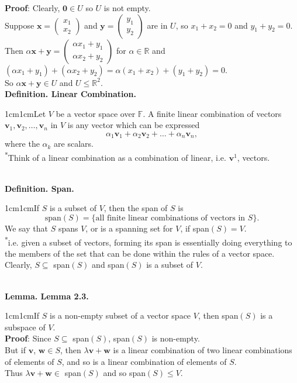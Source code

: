\documentclass{article}
\newcommand{\vect}[1]{\mathbf{#1}}
\newcommand{\definition}[2]{\textbf{Definition. #1.}\begin{adjustwidth}{1cm}{1cm}#2\end{adjustwidth}}
\newcommand{\lemma}[2]{\textbf{Lemma. #1.}\begin{adjustwidth}{1cm}{1cm}#2\end{adjustwidth}}
\begin{document}
\textbf{Proof}: Clearly, $\vect{0} \in U$ so $U$ is not empty.\\Suppose $\vect{x} = \begin{pmatrix}x_1 \\ x_2\end{pmatrix}$ and $\vect{y} = \begin{pmatrix}y_1 \\ y_2\end{pmatrix}$ are in $U$, so $x_1 + x_2 = 0$ and $y_1 + y_2 = 0$.\\Then $\alpha\vect{x} + \vect{y} = \begin{pmatrix}\alpha x_1 + y_1 \\ \alpha x_2 + y_2\end{pmatrix}$ for $\alpha \in \mathbb{R}$ and $(\alpha x_1 + y_1) + (\alpha x_2 + y_2) = \alpha(x_1 + x_2) + (y_1 + y_2) = 0$.\\So $\alpha \vect{x} + \vect{y} \in U$ and $U \leq \mathbb{R}^2$.\\[1\baselineskip]
\definition{Linear Combination}{Let $V$ be a vector space over $\mathbb{F}$. A finite linear combination of vectors $\vect{v}_1, \vect{v}_2, \ldots, \vect{v}_n$ in $V$ is any vector which can be expressed\[\alpha_1 \vect{v}_1 + \alpha_2 \vect{v}_2 + \ldots + \alpha _n \vect{v}_n ,\]where the $\alpha_k$ are scalars.\\[1\baselineskip]\textsuperscript{*}Think of a linear combination as a combination of linear, i.e. $\vect{v}^1$, vectors.}~\\
\definition{Span}{If $S$ is a subset of $V$, then the span of $S$ is \[\text{span}(S) = \{\text{all finite linear combinations of vectors in }S\}.\]We say that $S$ spans $V$, or is a spanning set for $V$, if span$(S) = V$.\\[1\baselineskip]\textsuperscript{*}i.e. given a subset of vectors, forming its span is essentially doing everything to the members of the set that can be done within the rules of a vector space.\\Clearly, $S \subseteq$ span$(S)$ and span$(S)$ is a subset of $V$.}~\\
\lemma{Lemma 2.3}{If $S$ is a non-empty subset of a vector space $V$, then span$(S)$ is a subspace of $V$.\\[1\baselineskip]\textbf{Proof}: Since $S \subseteq$ span$(S)$, span$(S)$ is non-empty.\\But if $\vect{v}$, $\vect{w} \in S$, then $\lambda \vect{v} + \vect{w}$ is a linear combination of two linear combinations of elements of $S$, and so is a linear combination of elements of $S$.\\Thus $\lambda \vect{v} + \vect{w} \in$ span$(S)$ and so span$(S) \leq V$.}~\\
\end{document}
